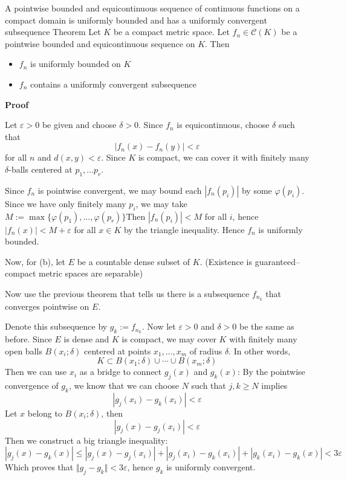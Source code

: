 \begin{result}
    {A pointwise bounded and equicontinuous sequence of continuous functions on a compact domain is uniformly bounded and has a uniformly convergent subsequence}
    {Theorem}
    Let $K$ be a compact metric space. Let $f_n \in \mathscr{C}(K)$ be a pointwise bounded and equicontinuous sequence on $K$. Then
    \begin{itemize}
        \item[(a)] $f_n$ is uniformly bounded on $K$
        \item[(b)] $f_n$ contains a uniformly convergent subsequence
    \end{itemize}

    \textbf{Proof}

    Let $\varepsilon >0$ be given and choose $\delta > 0$. Since $f_n$ is equicontinuous, choose $\delta$ such that
    \[|f_n(x) - f_n(y)| < \varepsilon\]
    for all $n$ and $d(x, y) < \varepsilon$. Since $K$ is compact, we can cover it with finitely many $\delta$-balls centered at $p_1, \ldots p_r$. 

    Since $f_n$ is pointwise convergent, we may bound each $|f_n(p_i)|$ by some $\varphi(p_i)$. Since we have only finitely many $p_i$, we may take $M := \max \{\varphi(p_1), \ldots, \varphi(p_r)\}$Then $|f_n(p_i)| < M$ for all $i$, hence $|f_n(x)| < M + \varepsilon$ for all $x \in K$ by the triangle inequality. Hence $f_n$ is uniformly bounded.

    Now, for (b), let $E$ be a countable dense subset of $K$. (Existence is guaranteed-- compact metric spaces are separable)

    Now use the previous theorem that tells us there is a subsequence $f_{n_k}$ that converges pointwise on $E$.

    Denote this subsequence by $g_k := f_{n_k}$. Now let $\varepsilon > 0$ and $\delta > 0$ be the same as before. Since $E$ is dense and $K$ is compact, we may cover $K$ with finitely many open balls $B(x_i; \delta)$ centered at points $x_1, \ldots, x_m$ of radius $\delta$. In other words,
    \[K \subset B(x_1; \delta) \cup \cdots \cup B(x_m; \delta)\]
    Then we can use $x_i$ as a bridge to connect $g_j(x)$ and $g_k(x)$: By the pointwise convergence of $g_k$, we know that we can choose $N$ such that $j, k \geq N$ implies 
    \[|g_j(x_i) - g_k(x_i)| < \varepsilon\]
    Let $x$ belong to $B(x_i; \delta)$, then
    \[|g_j(x) - g_j(x_i)| < \varepsilon\]
    Then we construct a big triangle inequality:
    \[|g_j(x) - g_k(x)| \leq |g_j(x) - g_j(x_i)| + |g_j(x_i) - g_k(x_i)| + |g_k(x_i) - g_k(x)| < 3\varepsilon\]
    Which proves that $\Vert g_j - g_k \Vert < 3\varepsilon$, hence $g_k$ is uniformly convergent.
\end{result}

